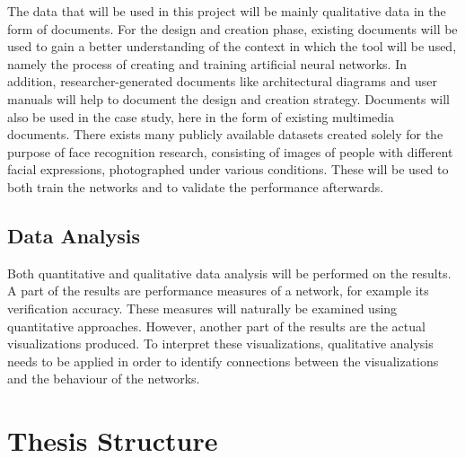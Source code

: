 The data that will be used in this project will be mainly qualitative data in the form of documents. For the design and creation phase, existing documents will be used to gain a better understanding of the context in which the tool will be used, namely the process of creating and training artificial neural networks. In addition, researcher-generated documents like architectural diagrams and user manuals will help to document the design and creation strategy. Documents will also be used in the case study, here in the form of existing multimedia documents. There exists many publicly available datasets created solely for the purpose of face recognition research, consisting of images of people with different facial expressions, photographed under various conditions. These will be used to both train the networks and to validate the performance afterwards.

\subsection{Data Analysis}

Both quantitative and qualitative data analysis will be performed on the results. A part of the results are performance measures of a network, for example its verification accuracy. These measures will naturally be examined using quantitative approaches. However, another part of the results are the actual visualizations produced. To interpret these visualizations, qualitative analysis needs to be applied in order to identify connections between the visualizations and the behaviour of the networks.

\section{Thesis Structure}

